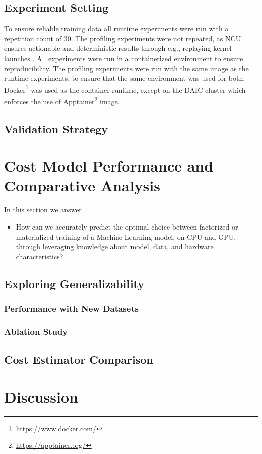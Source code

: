 \subsection{Experiment Setting}
To ensure reliable training data all runtime experiments were run with a repetition count of $30$. The profiling experiments were not repeated, as NCU ensures actionable and deterministic results through e.g., replaying kernel launches \cite{nsight_compute}. All experiments were run in a containerized environment to ensure reproducibility. The profiling experiments were run with the same image as the runtime experiments, to ensure that the same environment was used for both. Docker\footnote{\url{https://www.docker.com/}} was used as the container runtime, except on the DAIC cluster which enforces the use of Apptainer\footnote{\url{https://apptainer.org/}} image.

\subsection{Validation Strategy}
\label{subsec:6-validation-strategy}


\section{Cost Model Performance and Comparative Analysis}
\label{sec:eval-model-evaluation}

In this section we answer
\begin{itemize}
  \item[RQ.2] How can we accurately predict the optimal choice between factorized or materialized training of a Machine Learning model, on CPU and GPU, through leveraging knowledge about model, data, and hardware characteristics?
\end{itemize}

\subsection{Exploring Generalizability}
\subsubsection{Performance with New Datasets}

\subsubsection{Ablation Study}


\subsection{Cost Estimator Comparison}


\section{Discussion}
\label{sec:eval-discussion}


